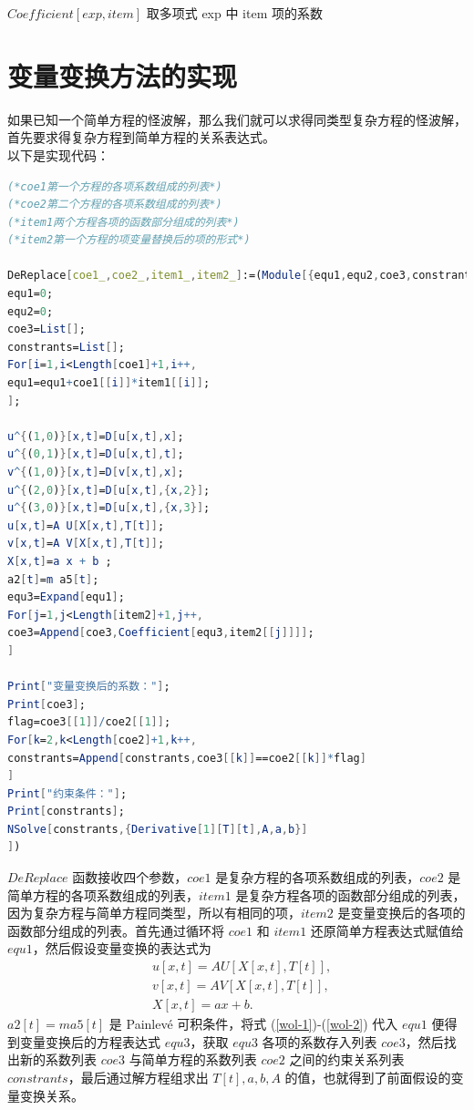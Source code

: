 $Coefficient[exp,item]$   \quad       取多项式 exp 中 item 项的系数
\section{变量变换方法的实现}
如果已知一个简单方程的怪波解，那么我们就可以求得同类型复杂方程的怪波解，首先要求得复杂方程到简单方程的关系表达式。\\ 

以下是实现代码：
\begin{lstlisting}[language=Mathematica,caption=变量变换方法的实现]
(*coe1第一个方程的各项系数组成的列表*)
(*coe2第二个方程的各项系数组成的列表*)
(*item1两个方程各项的函数部分组成的列表*)
(*item2第一个方程的项变量替换后的项的形式*)

DeReplace[coe1_,coe2_,item1_,item2_]:=(Module[{equ1,equ2,coe3,constrants,i,j,k},
equ1=0;
equ2=0;
coe3=List[];
constrants=List[];
For[i=1,i<Length[coe1]+1,i++,
equ1=equ1+coe1[[i]]*item1[[i]];
];

u^{(1,0)}[x,t]=D[u[x,t],x];
u^{(0,1)}[x,t]=D[u[x,t],t];
v^{(1,0)}[x,t]=D[v[x,t],x];
u^{(2,0)}[x,t]=D[u[x,t],{x,2}];
u^{(3,0)}[x,t]=D[u[x,t],{x,3}];
u[x,t]=A U[X[x,t],T[t]];
v[x,t]=A V[X[x,t],T[t]];
X[x,t]=a x + b ;
a2[t]=m a5[t];
equ3=Expand[equ1];
For[j=1,j<Length[item2]+1,j++,
coe3=Append[coe3,Coefficient[equ3,item2[[j]]]];
]

Print["变量变换后的系数："];
Print[coe3];
flag=coe3[[1]]/coe2[[1]];
For[k=2,k<Length[coe2]+1,k++,
constrants=Append[constrants,coe3[[k]]==coe2[[k]]*flag]
]
Print["约束条件："];
Print[constrants];
NSolve[constrants,{Derivative[1][T][t],A,a,b}]
])
\end{lstlisting}
$DeReplace$ 函数接收四个参数，$coe1$ 是复杂方程的各项系数组成的列表，$coe2$ 是简单方程的各项系数组成的列表，$item1$ 是复杂方程各项的函数部分组成的列表，因为复杂方程与简单方程同类型，所以有相同的项，$item2$ 是变量变换后的各项的函数部分组成的列表。首先通过循环将 $coe1$ 和 $item1$ 还原简单方程表达式赋值给 $equ1$，然后假设变量变换的表达式为
\begin{align}
&u[x,t]=A U[X[x,t],T[t]],\label{wol-1}\\
&v[x,t]=A V[X[x,t],T[t]],\\
&X[x,t]=a x + b. \label{wol-2}
\end{align}
$a2[t]=m a5[t]$ 是 Painlev\'{e} 可积条件，将式 (\ref{wol-1})-(\ref{wol-2}) 代入 $equ1$ 便得到变量变换后的方程表达式 $equ3$，获取 $equ3$ 各项的系数存入列表 $coe3$，然后找出新的系数列表 $coe3$ 与简单方程的系数列表 $coe2$ 之间的约束关系列表 $constrants$，最后通过解方程组求出 $T[t], a, b, A$ 的值，也就得到了前面假设的变量变换关系。

